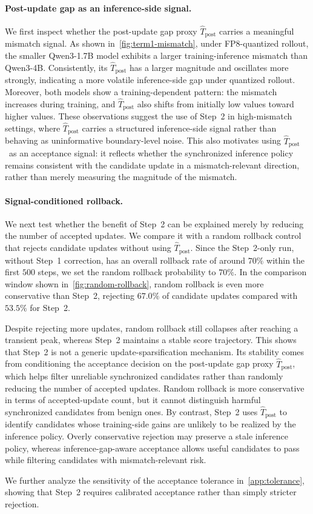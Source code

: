 \paragraph{Post-update gap as an inference-side signal.}
We first inspect whether the post-update gap proxy $\widehat{T}_{\mathrm{post}}$ carries a meaningful mismatch signal.
As shown in~\autoref{fig:term1-mismatch}, under FP8-quantized rollout, the smaller Qwen3-1.7B model exhibits a larger training-inference mismatch than Qwen3-4B.
Consistently, its $\widehat{T}_{\mathrm{post}}$ has a larger magnitude and oscillates more strongly, indicating a more volatile inference-side gap under quantized rollout.
Moreover, both models show a training-dependent pattern: the mismatch increases during training, and $\widehat{T}_{\mathrm{post}}$ also shifts from initially low values toward higher values.
These observations suggest the use of Step~2 in high-mismatch settings, where $\widehat{T}_{\mathrm{post}}$ carries a structured inference-side signal rather than behaving as uninformative boundary-level noise.
This also motivates using \(\widehat{T}_{\mathrm{post}}\)\ as an acceptance signal: it reflects whether the synchronized inference policy remains consistent with the candidate update in a mismatch-relevant direction, rather than merely measuring the magnitude of the mismatch.




\paragraph{Signal-conditioned rollback.}
We next test whether the benefit of Step~2 can be explained merely by reducing the number of accepted updates.
We compare it with a random rollback control that rejects candidate updates without using $\widehat{T}_{\mathrm{post}}$.
Since the Step~2-only run, without Step~1 correction, has an overall rollback rate of around $70\%$ within the first $500$ steps, we set the random rollback probability to $70\%$.
In the comparison window shown in~\autoref{fig:random-rollback}, random rollback is even more conservative than Step~2, rejecting $67.0\%$ of candidate updates compared with $53.5\%$ for Step~2.

Despite rejecting more updates, random rollback still collapses after reaching a transient peak, whereas Step~2 maintains a stable score trajectory.
This shows that Step~2 is not a generic update-sparsification mechanism.
Its stability comes from conditioning the acceptance decision on the post-update gap proxy $\widehat{T}_{\mathrm{post}}$, which helps filter unreliable synchronized candidates rather than randomly reducing the number of accepted updates.
Random rollback is more conservative in terms of accepted-update count, but it cannot distinguish harmful synchronized candidates from benign ones.
By contrast, Step~2 uses $\widehat{T}_{\mathrm{post}}$ to identify candidates whose training-side gains are unlikely to be realized by the inference policy. 
Overly conservative rejection may preserve a stale inference policy, whereas inference-gap-aware acceptance allows useful candidates to pass while filtering candidates with mismatch-relevant risk.

We further analyze the sensitivity of the acceptance tolerance in~\autoref{app:tolerance}, showing that Step~2 requires calibrated acceptance rather than simply stricter rejection.